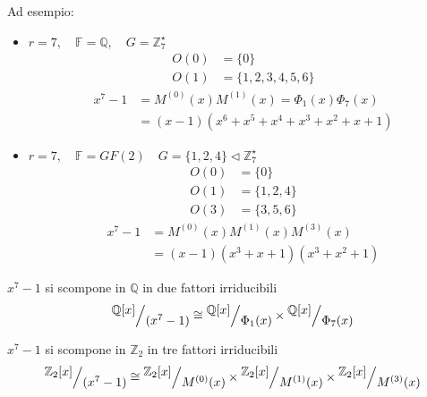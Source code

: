 \documentclass[mathserif]{beamer}
\def\quotient#1#2{%
   \raise1ex\hbox{$#1$}\Big/\lower1ex\hbox{$#2$}%
}
\begin{document}
\thispagestyle{empty}
\begin{frame}
   \vspace{-1.2cm}
   Ad esempio:
   \begin{itemize}
      \item   $r = 7 , \quad \mathbb{F} = \mathbb{Q}, \quad G = \mathbb{Z}_{7}^{\star}$
	  \begin{align*}
	      O(0)&= \lbrace 0 \rbrace \\
	      O(1)&= \lbrace 1,2,3,4,5,6 \rbrace
	  \end{align*}
	    \begin{align*}
	      x^{7} - 1 &= M^{(0)}(x) M^{(1)}(x) =  \Phi_{1}(x) \Phi_{7}(x)  \\
			&= (x-1)(x^6 +x^5 + x^4 + x^3 +x^2 + x +1)
	    \end{align*}
      \item  $r = 7 , \quad \mathbb{F} = GF(2)  \quad G =\lbrace 1,2,4 \rbrace \triangleleft \mathbb{Z}_{7}^{\star}$
	  \begin{align*}
	      O(0) &= \lbrace 0 \rbrace \\
	      O(1) &= \lbrace 1,2,4 \rbrace \\
	      O(3) &= \lbrace 3,5,6 \rbrace
	  \end{align*}
	  \begin{align*}
	      x^{7} - 1 &= M^{(0)}(x) M^{(1)}(x) M^{(3)}(x) \\
			&= (x-1)(x^3 + x + 1)(x^3 + x^2 + 1)
	    \end{align*}
   \end{itemize}
\end{frame}

\thispagestyle{empty}
\begin{frame}
   \vspace{-1.5cm}
        \begin{center}
         $x^7 - 1$ si scompone in $ \mathbb{Q} $ in due fattori irriducibili
	\begin{align*}
	  \quotient{\mathbb{Q} \lbrack x \rbrack  }{(x^{7} - 1)}
	  \cong
	  \quotient{\mathbb{Q} \lbrack x \rbrack  }{\Phi_{1}(x)}
	  \times
	  \quotient{\mathbb{Q} \lbrack x \rbrack  }{\Phi_{7}(x)}
	\end{align*}
	\vspace{1cm}

	 $x^7 - 1$ si scompone in $ \mathbb{Z}_{2}$ in tre fattori irriducibili
	\begin{align*}
	  \quotient{\mathbb{Z}_{2} \lbrack x \rbrack  }{(x^{7} - 1)}
	  \cong
	  \quotient{\mathbb{Z}_{2} \lbrack x \rbrack  }{M^{(0)}(x)}
	  \times
	  \quotient{\mathbb{Z}_{2} \lbrack x \rbrack  }{M^{(1)}(x)}
	  \times
	  \quotient{\mathbb{Z}_{2} \lbrack x \rbrack  }{M^{(3)}(x)}
	\end{align*}
	\end{center}
\end{frame}
\end{document}
